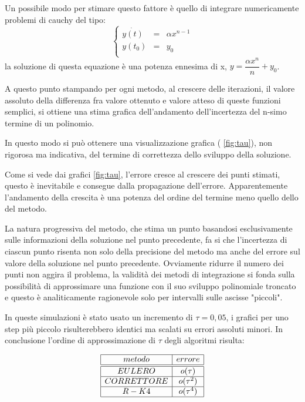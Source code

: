 \documentclass[11pt]{article}
\begin{document}
Un possibile modo per stimare questo fattore è quello di integrare numericamente problemi di cauchy del tipo:
\begin{equation}
	\left\{ 
			\begin{array}{rcl}
 			\dot{y(t)} &=& \alpha x^{n-1}\\
 			y(t_{0}) &=& y_{0} \\
  			\end{array} \right.
	\end{equation}
la soluzione di questa equazione è una potenza ennesima di x, $y=\dfrac{\alpha x^{n}}{n}+y_{0}$.

A questo punto stampando per ogni metodo, al crescere delle iterazioni, il valore assoluto della differenza fra valore ottenuto e valore atteso di queste funzioni semplici, si ottiene una stima grafica dell'andamento dell'incertezza del n-simo termine di un polinomio.

In questo modo si può ottenere una visualizzazione grafica ( \ref{fig:tau}), non rigorosa ma indicativa, del termine di correttezza dello sviluppo della soluzione.

Come si vede dai grafici \ref{fig:tau}, l'errore cresce al crescere dei punti stimati, questo è inevitabile e consegue dalla propagazione dell'errore.
Apparentemente l'andamento della crescita è una potenza del ordine del termine meno quello dello del metodo.

La natura progressiva del metodo, che stima un punto basandosi esclusivamente sulle informazioni della soluzione nel punto precedente, fa si che l'incertezza di ciascun punto risenta non solo della precisione del metodo ma anche del errore sul valore della soluzione nel punto precedente.
Ovviamente ridurre il numero dei punti non aggira il problema, la validità dei metodi di integrazione si fonda sulla possibilità di approssimare una funzione con il suo sviluppo polinomiale troncato e questo è analiticamente ragionevole solo per intervalli sulle ascisse "piccoli".

In queste simulazioni è stato usato un incremento di $\tau = 0,05$, i grafici per uno step più piccolo risulterebbero identici ma scalati su errori assoluti minori.
In conclusione l'ordine di approssimazione di $\tau$ degli algoritmi risulta:
    			
\begin{displaymath}
\centering
\begin{array}{|c|c|}
\hline
metodo & errore \\
\hline
\hline
EULERO &  o(\tau) \\
\hline
CORRETTORE &  o(\tau^2) \\
\hline
R-K 4 &  o(\tau^4) \\
\hline
\end{array}
\end{displaymath}
\end{document}
